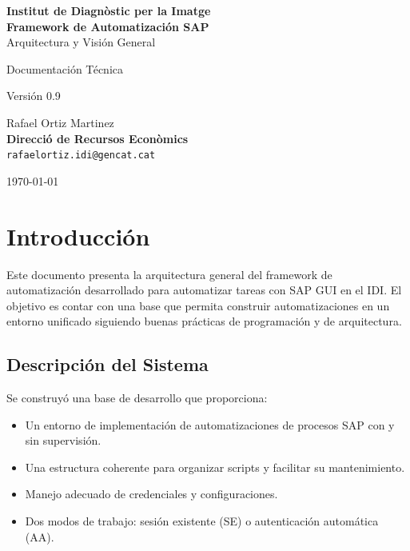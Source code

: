 \documentclass[11pt,a4paper]{article}
\begin{document}
\begin{titlepage}
    \centering
    \vspace*{2cm}
    
    {\Huge\bfseries Institut de Diagnòstic per la Imatge\\[1cm]}
    {\Huge\bfseries Framework de Automatización SAP\\[0.5cm]}
    {\LARGE Arquitectura y Visión General\\[0.5cm]}
    
    \vfill
    
    {\Large Documentación Técnica\\[0.3cm]}
    
    {\large Versión 0.9\\[2cm]}

    {\Large Rafael Ortiz Martinez\\[0.1cm]
      \textbf{Direcció de Recursos Econòmics}\\[0.1cm]
      \texttt{rafaelortiz.idi@gencat.cat\\[1.5cm]}}

    {\large \today}
    
    \vfill
\end{titlepage}

\tableofcontents
\newpage


\section{Introducción}

Este documento presenta la arquitectura general del framework de automatización desarrollado para automatizar tareas con SAP GUI en el IDI.  El objetivo es contar con una base que permita construir automatizaciones en un entorno unificado siguiendo buenas prácticas de programación y de arquitectura.

\subsection{Descripción del Sistema}

Se construyó una base de desarrollo que proporciona:

\begin{itemize}[itemsep=6pt]
    \item Un entorno de implementación de automatizaciones de procesos SAP con y sin supervisión.
    \item Una estructura coherente para organizar scripts y facilitar su mantenimiento.
    \item Manejo adecuado de credenciales y configuraciones.
    \item Dos modos de trabajo: sesión existente (SE) o autenticación automática (AA).
\end{itemize}
\end{document}
